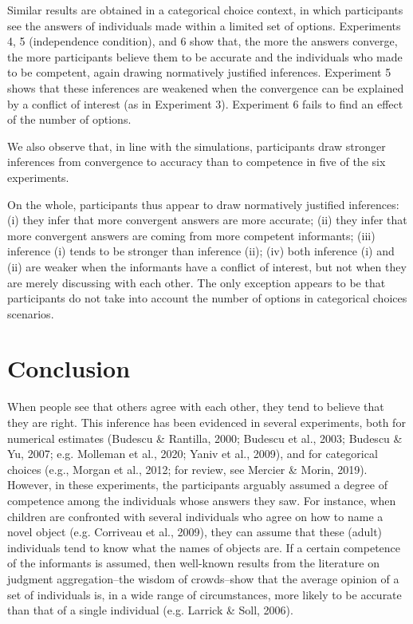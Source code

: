 \documentclass[
  doc,floatsintext]{apa6}
\begin{document}
Similar results are obtained in a categorical choice context, in which participants see the answers of individuals made within a limited set of options. Experiments 4, 5 (independence condition), and 6 show that, the more the answers converge, the more participants believe them to be accurate and the individuals who made to be competent, again drawing normatively justified inferences. Experiment 5 shows that these inferences are weakened when the convergence can be explained by a conflict of interest (as in Experiment 3). Experiment 6 fails to find an effect of the number of options.

We also observe that, in line with the simulations, participants draw stronger inferences from convergence to accuracy than to competence in five of the six experiments.

On the whole, participants thus appear to draw normatively justified inferences: (i) they infer that more convergent answers are more accurate; (ii) they infer that more convergent answers are coming from more competent informants; (iii) inference (i) tends to be stronger than inference (ii); (iv) both inference (i) and (ii) are weaker when the informants have a conflict of interest, but not when they are merely discussing with each other. The only exception appears to be that participants do not take into account the number of options in categorical choices scenarios.

\section{Conclusion}\label{conclusion}

When people see that others agree with each other, they tend to believe that they are right. This inference has been evidenced in several experiments, both for numerical estimates (Budescu \& Rantilla, 2000; Budescu et al., 2003; Budescu \& Yu, 2007; e.g. Molleman et al., 2020; Yaniv et al., 2009), and for categorical choices (e.g., Morgan et al., 2012; for review, see Mercier \& Morin, 2019). However, in these experiments, the participants arguably assumed a degree of competence among the individuals whose answers they saw. For instance, when children are confronted with several individuals who agree on how to name a novel object (e.g. Corriveau et al., 2009), they can assume that these (adult) individuals tend to know what the names of objects are. If a certain competence of the informants is assumed, then well-known results from the literature on judgment aggregation--the wisdom of crowds--show that the average opinion of a set of individuals is, in a wide range of circumstances, more likely to be accurate than that of a single individual (e.g. Larrick \& Soll, 2006).
\end{document}
